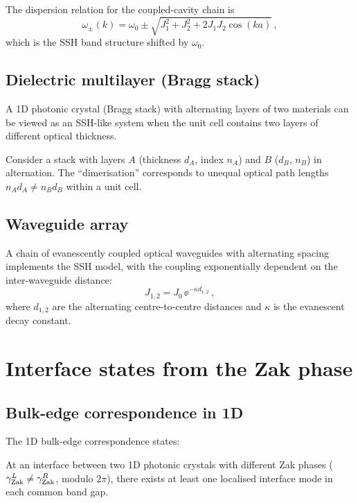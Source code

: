 The dispersion relation for the coupled-cavity chain is
\begin{equation}\label{eq:ch14-coupled-cavity-dispersion}
  \omega_\pm(k) = \omega_0 \pm \sqrt{J_1^2+J_2^2+2J_1J_2\cos(ka)}\,,
\end{equation}
which is the SSH band structure shifted by $\omega_0$.

\subsection{Dielectric multilayer (Bragg stack)}
\label{sec:ch14-bragg}

A 1D photonic crystal (Bragg stack) with alternating layers of two
materials can be viewed as an SSH-like system when the unit cell
contains two layers of different optical thickness.

Consider a stack with layers $A$ (thickness $d_A$, index $n_A$) and
$B$ ($d_B$, $n_B$) in alternation.  The ``dimerisation'' corresponds to
unequal optical path lengths $n_Ad_A\neq n_Bd_B$ within a unit cell.

\subsection{Waveguide array}
\label{sec:ch14-waveguide-array}

A chain of evanescently coupled optical waveguides with alternating
spacing implements the SSH model, with the coupling exponentially
dependent on the inter-waveguide distance:
\begin{equation}\label{eq:ch14-waveguide-coupling}
  J_{1,2} = J_0\,\ee^{-\kappa d_{1,2}}\,,
\end{equation}
where $d_{1,2}$ are the alternating centre-to-centre distances and
$\kappa$ is the evanescent decay constant.

\section{Interface states from the Zak phase}
\label{sec:ch14-interface}

\subsection{Bulk-edge correspondence in 1D}
\label{sec:ch14-bec-1d}

The 1D bulk-edge correspondence states:

\begin{theorem}
  \label{thm:ch14-bec}
  At an interface between two 1D photonic crystals with different Zak
  phases ($\gamma_{\mathrm{Zak}}^L\neq\gamma_{\mathrm{Zak}}^R$, modulo $2\pi$), there exists at least
  one localised interface mode in each common band gap.
\end{theorem}


